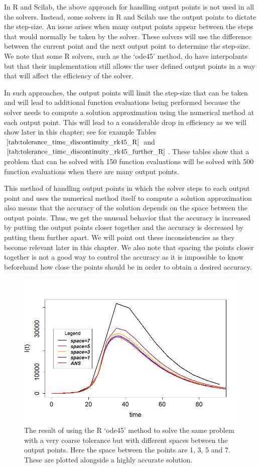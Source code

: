 In R and Scilab, the above approach for handling output points is not used in all the solvers. Instead, some solvers in R and Scilab use the output points to dictate the step-size. An issue arises when many output points appear between the steps that would normally be taken by the solver. These solvers will use the difference between the current point and the next output point to determine the step-size. We note that some R solvers, such as the `ode45' method, do have interpolants but that their implementation still allows the user defined output points in a way that will affect the efficiency of the solver. 

In such approaches, the output points will limit the step-size that can be taken and will lead to additional function evaluations being performed because the solver needs to compute a solution approximation using the numerical method at each output point. This will lead to a considerable drop in efficiency as we will show later in this chapter; see for example Tables $\ref{tab:tolerance_time_discontinuity_rk45_R}$ and $\ref{tab:tolerance_time_discontinuity_rk45_further_R}$. These tables show that a problem that can be solved with 150 function evaluations will be solved with 500 function evaluations when there are many output points. 

This method of handling output points in which the solver steps to each output point and uses the numerical method itself to compute a solution approximation also means that the accuracy of the solution depends on the space between the output points. Thus, we get the unusual behavior that the accuracy is increased by putting the output points closer together and the accuracy is decreased by putting them further apart. We will point out these inconsistencies as they become relevant later in this chapter. We also note that spacing the points closer together is not a good way to control the accuracy as it is impossible to know beforehand how close the points should be in order to obtain a desired accuracy.

\begin{figure}[H]
\centering
\includegraphics[width=0.7\linewidth]{./figures/R_ode45_spacing_experiment}
\caption{The result of using the R `ode45' method to solve the same problem with a very coarse tolerance but with different spaces between the output points. Here the space between the points are 1, 3, 5 and 7. These are plotted alongside a highly accurate solution.}
\label{fig:ode45_spacing_experiment}
\end{figure}

